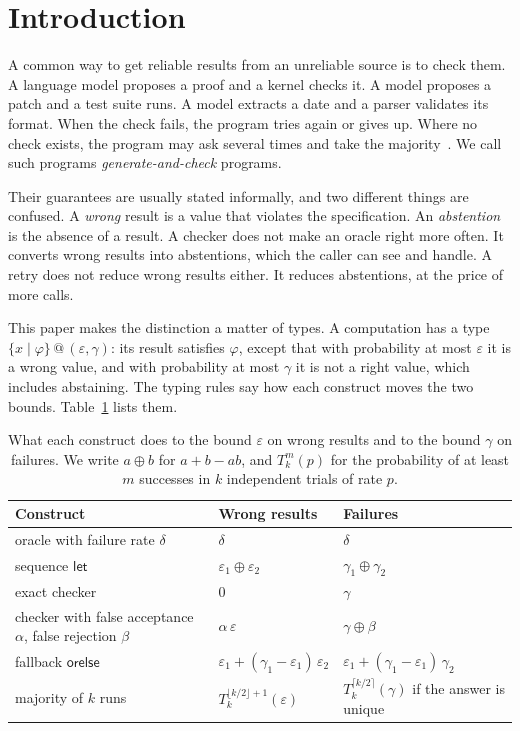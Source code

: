 \documentclass[acmsmall,nonacm,screen]{acmart}
\makeatletter
\newcommand{\kw}[1]{\mathsf{#1}}
\newcommand{\rty}[2]{\{#1 \mid #2\}}
\newcommand{\at}[2]{\mathrel{@}(#1, #2)}
\newcommand{\tl}[3]{T_{#1}^{#2}(#3)}
\makeatother
\begin{document}
\section{Introduction}

A common way to get reliable results from an unreliable source is to check them. A language
model proposes a proof and a kernel checks it. A model proposes a patch and a test suite runs.
A model extracts a date and a parser validates its format. When the check fails, the program
tries again or gives up. Where no check exists, the program may ask several times and take
the majority~\citep{wang2022}. We call such programs \emph{generate-and-check} programs.

Their guarantees are usually stated informally, and two different things are confused. A
\emph{wrong} result is a value that violates the specification. An \emph{abstention} is the
absence of a result. A checker does not make an oracle right more often. It converts wrong
results into abstentions, which the caller can see and handle. A retry does not reduce wrong
results either. It reduces abstentions, at the price of more calls.

This paper makes the distinction a matter of types. A computation has a type
$\rty{x}{\varphi} \at{\varepsilon}{\gamma}$: its result satisfies $\varphi$, except that with
probability at most $\varepsilon$ it is a wrong value, and with probability at most $\gamma$ it
is not a right value, which includes abstaining. The typing rules say how each construct moves
the two bounds. Table~\ref{tab:rules} lists them.

\begin{table}[t]
\caption{What each construct does to the bound $\varepsilon$ on wrong results and to the bound
$\gamma$ on failures. We write $a \oplus b$ for $a + b - ab$, and $\tl{k}{m}{p}$ for the
probability of at least $m$ successes in $k$ independent trials of rate $p$.}
\label{tab:rules}
\small
\begin{tabular}{@{}lll@{}}
\toprule
Construct & Wrong results & Failures \\
\midrule
oracle with failure rate $\delta$ & $\delta$ & $\delta$ \\
sequence $\kw{let}$ & $\varepsilon_1 \oplus \varepsilon_2$ & $\gamma_1 \oplus \gamma_2$ \\
exact checker & $0$ & $\gamma$ \\
checker with false acceptance $\alpha$, false rejection $\beta$ & $\alpha\,\varepsilon$ & $\gamma \oplus \beta$ \\
fallback $\kw{orelse}$ & $\varepsilon_1 + (\gamma_1 - \varepsilon_1)\,\varepsilon_2$ & $\varepsilon_1 + (\gamma_1 - \varepsilon_1)\,\gamma_2$ \\
majority of $k$ runs & $\tl{k}{\lfloor k/2 \rfloor + 1}{\varepsilon}$ & $\tl{k}{\lceil k/2 \rceil}{\gamma}$ if the answer is unique \\
\bottomrule
\end{tabular}
\end{table}
\end{document}

